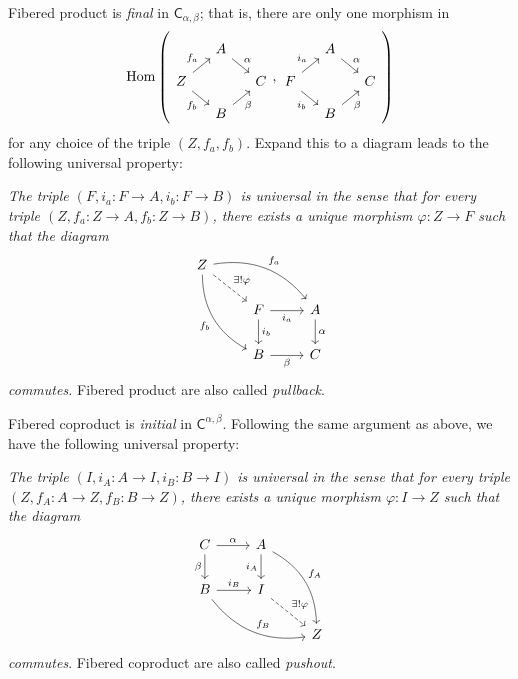 \begin{sol}
Fibered product is \emph{final} in $\mathsf{C}_{\alpha, \beta}$; that is, there are only one morphism in 
\[
\Hom\left(
\begin{tikzcd}[column sep=small, row sep=small]
& A \arrow[rd, "\alpha"] &   \\
Z \arrow[ru, "f_a"] \arrow[rd, "f_b"'] &  & C \\
& B \arrow[ru, "\beta"'] &  
\end{tikzcd},
\begin{tikzcd}[column sep=small, row sep=small]
& A \arrow[rd, "\alpha"] &   \\
F \arrow[ru, "i_a"] \arrow[rd, "i_b"'] &  & C \\
& B \arrow[ru, "\beta"'] &  
\end{tikzcd}
\right)    
\]
for any choice of the triple $(Z,f_a,f_b)$. Expand this to a diagram leads to the following universal property:

\textit{
The triple $(F, i_a:F \to A, i_b:F \to B)$ is universal in the sense that for every triple $(Z,f_a:Z \to A,f_b:Z \to B)$, there exists a unique morphism $\varphi: Z \to F$ such that the diagram}
\[
\begin{tikzcd}
Z \arrow[rd, "\exists!\varphi", dashed] \arrow[rdd, "f_b"', bend right] \arrow[rrd, "f_a", bend left] & & \\
& F \arrow[d, "i_b"] \arrow[r, "i_a"'] & A \arrow[d, "\alpha"] \\
& B \arrow[r, "\beta"']  & C                    
\end{tikzcd}    
\]
\textit{commutes.} Fibered product are also called \emph{pullback}.

Fibered coproduct is \emph{initial} in $\mathsf{C}^{\alpha, \beta}$. Following the same argument as above, we have the following universal property:

\textit{
The triple $(I, i_A:A \to I, i_B:B \to I)$ is universal in the sense that for every triple $(Z,f_A:A \to Z,f_B:B \to Z)$, there exists a unique morphism $\varphi: I \to Z$ such that the diagram}
\[
\begin{tikzcd}
C \arrow[r, "\alpha"] \arrow[d, "\beta"']         & A \arrow[d, "i_A"'] \arrow[rdd, "f_A", bend left] &   \\
B \arrow[r, "i_B"] \arrow[rrd, "f_B", bend right] & I \arrow[rd, "\exists!\varphi", dashed]   &   \\
& & Z
\end{tikzcd}    
\]
\textit{commutes}. Fibered coproduct are also called \emph{pushout}.


\end{sol}
